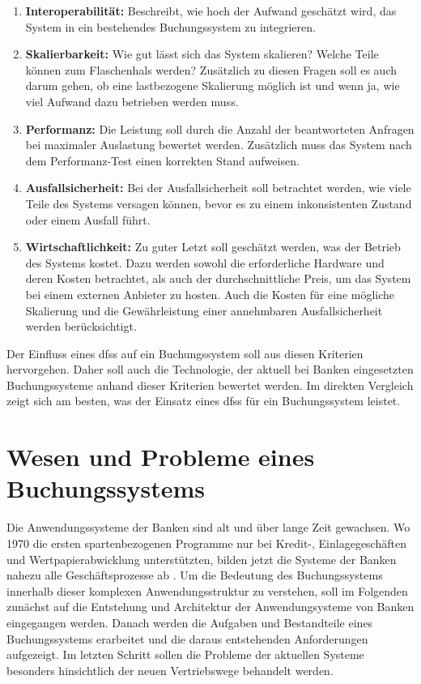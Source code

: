 \documentclass[12pt,oneside,a4paper,parskip]{scrbook}
\begin{document}
\begin{enumerate}
  \item \textbf{Interoperabilität:} Beschreibt, wie hoch der Aufwand geschätzt wird, das System in ein bestehendes Buchungssystem zu integrieren.
  \item \textbf{Skalierbarkeit:} Wie gut lässt sich das System skalieren? Welche Teile können zum Flaschenhals werden? Zusätzlich zu diesen Fragen soll es auch darum gehen, ob eine lastbezogene Skalierung möglich ist und wenn ja, wie viel Aufwand dazu betrieben werden muss.
  \item \textbf{Performanz:} Die Leistung soll durch die Anzahl der beantworteten Anfragen bei maximaler Auslastung bewertet werden. Zusätzlich muss das System nach dem Performanz-Test einen korrekten Stand aufweisen.
  \item \textbf{Ausfallsicherheit:} Bei der Ausfallsicherheit soll betrachtet werden, wie viele Teile des Systems versagen können, bevor es zu einem inkonsistenten Zustand oder einem Ausfall führt.
  \item \textbf{Wirtschaftlichkeit:} Zu guter Letzt soll geschätzt werden, was der Betrieb des Systems kostet. Dazu werden sowohl die erforderliche Hardware und deren Kosten betrachtet, als auch der durchschnittliche Preis, um das System bei einem externen Anbieter zu hosten. Auch die Kosten für eine mögliche Skalierung und die Gewährleistung einer annehmbaren Ausfallsicherheit werden berücksichtigt.
\end{enumerate}

Der Einfluss eines \acp{dfs} auf ein Buchungssystem soll aus diesen Kriterien hervorgehen.
Daher soll auch die Technologie, der aktuell bei Banken eingesetzten Buchungssysteme anhand dieser Kriterien bewertet werden. Im direkten Vergleich zeigt sich am besten, was der Einsatz eines \acp{dfs} für ein Buchungssystem leistet.

\chapter{Wesen und Probleme eines Buchungssystems}
\label{bookingSystem}
Die Anwendungssysteme der Banken sind alt und über lange Zeit gewachsen. Wo 1970 die ersten spartenbezogenen Programme nur bei Kredit-, Einlagegeschäften und
Wertpapierabwicklung unterstützten, bilden jetzt die Systeme der Banken nahezu alle Geschäftsprozesse ab \cite[16]{ITidF}. Um die Bedeutung des Buchungssystems innerhalb dieser komplexen Anwendungsstruktur zu verstehen, soll im Folgenden zunächst auf die Entstehung und Architektur der Anwendungsysteme von Banken eingegangen werden. Danach werden die Aufgaben und Bestandteile eines Buchungssystems erarbeitet und die daraus entstehenden Anforderungen aufgezeigt. Im letzten Schritt sollen die Probleme der aktuellen Systeme besonders hinsichtlich der neuen Vertriebswege behandelt werden. 
\label{buchungssystem}
\end{document}
